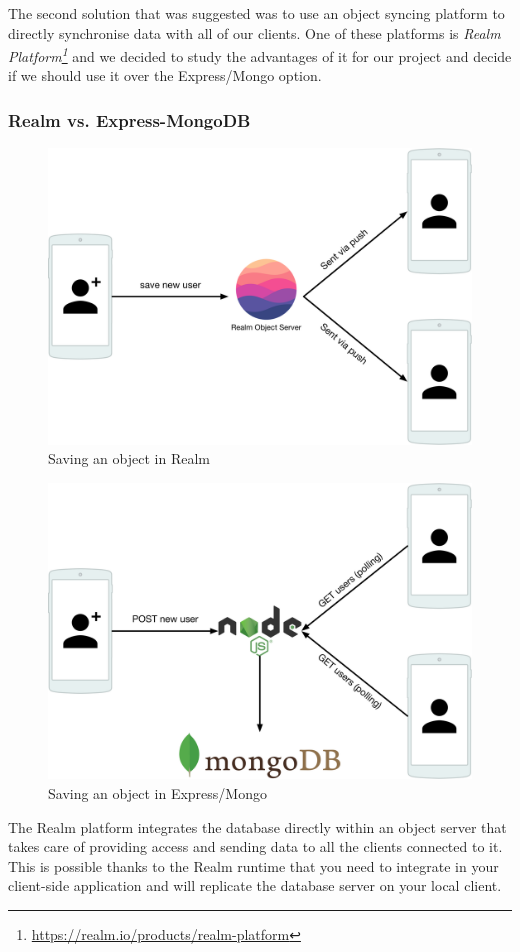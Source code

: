 \documentclass[11pt,a4paper]{report}
\begin{document}

The second solution that was suggested was to use an object syncing platform to directly synchronise data with all of our clients. One of these platforms is \emph{Realm Platform\footnote{\url{https://realm.io/products/realm-platform}}} and we decided to study the advantages of it for our project and decide if we should use it over the Express/Mongo option.
\subsubsection{Realm vs. Express-MongoDB}
\begin{figure}[H]
\begin{center}
	\includegraphics[width=.8\textwidth]{assets/realm_architecture}
	\caption{Saving an object in Realm}
	\label{realm_object_saving_figure}
\end{center}
\end{figure}

\begin{figure}[H]
\begin{center}
	\includegraphics[width=.8\textwidth]{assets/expressmongo_architecture.png}
	\caption{Saving an object in Express/Mongo}
		\label{mongo_object_saving_figure}
\end{center}
\end{figure}
The Realm platform integrates the database directly within an object server that takes care of providing access and sending data to all the clients connected to it. This is possible thanks to the Realm runtime that you need to integrate in your client-side application and will replicate the database server on your local client.\\
\end{document}
